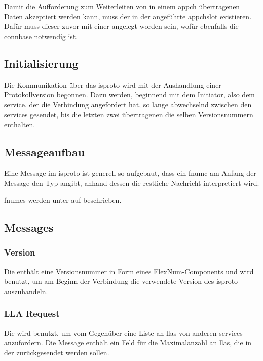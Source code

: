 Damit die Aufforderung zum Weiterleiten von in einem \gls{appch} übertragenen Daten akzeptiert
werden kann, muss der in der \msg{\isprotoacd} angeführte \gls{appchslot} existieren. Dafür
muss dieser zuvor mit einer \msg{\isprotoacsa} angelegt worden sein, wofür
ebenfalls die \gls{connbase}  notwendig ist.

\subsection{Initialisierung}
Die Kommunikation über das \gls{isproto} wird mit der Aushandlung einer Protokollversion begonnen.
Dazu werden, beginnend mit dem Initiator, also dem \gls{service}, der die Verbindung angefordert hat,
so lange \msgpl{\isprotoversion} abwechselnd zwischen den \glspl{service} gesendet, bis die letzten
zwei übertragenen \msgpl{\isprotoversion} die selben Versionsnummern enthalten.

\subsection{Messageaufbau}
Eine Message im \gls{isproto} ist generell so aufgebaut, dass ein \gls{fnumc} am Anfang der
Message den Typ angibt, anhand dessen die restliche Nachricht interpretiert wird.

\Glspl{fnumc} werden unter  auf
 beschrieben.

\isprotobytefield

\subsection{Messages}

\subsubsection{Version}
\label{dcl-isproto-version}
Die \msg{\isprotoversion} enthält eine Versionsnummer in Form eines FlexNum-Components und wird
benutzt, um am Beginn der Verbindung die verwendete Version des \gls{isproto} auszuhandeln.

\isprotoversionbytefield

\subsubsection{LLA Request}
\label{dcl-isproto-llareq}
Die \msg{\isprotollareq} wird benutzt, um vom Gegenüber eine Liste an \glspl{lla} von anderen
\glspl{service} anzufordern.
Die Message enthält ein Feld für die Maximalanzahl an \glspl{lla}, die in der
\msg{\isprotollarep} zurückgesendet werden sollen.

